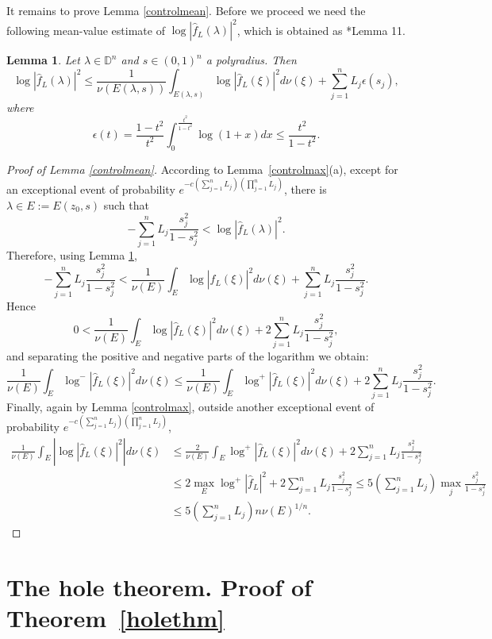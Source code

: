 \documentclass[12pt,twoside,final,amsfonts]{amsart}
\theoremstyle{plain}
\newtheorem{lemma}[theorem]{Lemma}
\theoremstyle{definition}
\theoremstyle{definition}
\begin{document}
It remains to prove Lemma \ref{controlmean}. Before we proceed we need the following mean-value estimate of $\log |\hat f_L(\lambda)|^2$, which is obtained as \cite{BMP}*{Lemma 11}.

\begin{lemma}\label{invlemma}
Let $\lambda\in{\mathbb{D}}^n$ and $s\in (0,1)^n$ a polyradius. Then
\[
\log |\hat f_L(\lambda)|^2 \leq \frac{1}{\nu (E(\lambda,s))}\int_{E(\lambda,s)}\log |\hat f_L(\xi)|^2 d\nu(\xi)+{\sum_{j=1}^n L_j} {\epsilon}(s_j),
\]
where
\[
{\epsilon}(t)=\frac{1-t^2}{t^2}\int^{\frac{t^2}{1-t^2}}_{0} \log(1+x)dx\leq \frac{t^2}{1-t^2}.
\]
\end{lemma}

\begin{proof}[Proof of Lemma \ref{controlmean}]
According to Lemma~\ref{controlmax}(a), except for an exceptional event of probability $e^{-c{(\sum_{j=1}^n L_j)(\prod_{j=1}^n L_j)}}$, there is $\lambda\in E:=E(z_0,s)$ such that
\[
-{\sum_{j=1}^n L_j} \frac{s_j^2}{1-s_j^2}<\log  |\hat f_L(\lambda)|^2.
\]
Therefore, using Lemma \ref{invlemma},
\[
-{\sum_{j=1}^n L_j} \frac{s_j^2}{1-s_j^2}<\frac{1}{\nu(E)}\int_{E}\log  |\hat f_L(\xi)|^2 d\nu(\xi)+{\sum_{j=1}^n L_j} \frac{s_j^2}{1-s_j^2} .
\]
Hence
\[
0 < \frac{1}{\nu(E)}\int_{E}\log |\hat f_L(\xi)|^2 d\nu(\xi) +2 {\sum_{j=1}^n L_j} \frac{s_j^2}{1-s_j^2},
\]
and separating the positive and negative parts of the logarithm we obtain:
\[
\frac{1}{\nu(E)}\int_{E}\log^{-}  |\hat f_L(\xi)|^2 d\nu(\xi)
\leq \frac{1}{\nu(E)}\int_{E}\log^{+} |\hat f_L(\xi)|^2 d\nu(\xi)+2 {\sum_{j=1}^n L_j} \frac{s_j^2}{1-s_j^2} .
\]
Finally, again by Lemma \ref{controlmax}, outside another exceptional event of probability $e^{-c{(\sum_{j=1}^n L_j)(\prod_{j=1}^n L_j)}}$,
\begin{align*}
\frac{1}{\nu(E)}\int_{E}\left|\log  |\hat f_L(\xi)|^2 \right|d\nu(\xi)&\leq \frac{2}{\nu(E)}\int_{E}\log^{+}  |\hat f_L(\xi)|^2 d\nu(\xi)+2 
{\sum_{j=1}^n L_j} \frac{s_j^2}{1-s_j^2}\\
& \leq 2\max_{E}\log^{+}  |\hat f_L|^2+2 {\sum_{j=1}^n L_j} \frac{s_j^2}{1-s_j^2}\leq 5 ({\sum_{j=1}^n L_j}) \max_j \frac{s_j^2}{1-s_j^2} \\
&\leq 5({\sum_{j=1}^n L_j}) n\nu(E)^{1/n}.
\end{align*}
\end{proof}

\section{The hole theorem. Proof of Theorem~\ref{holethm}}
\end{document}
